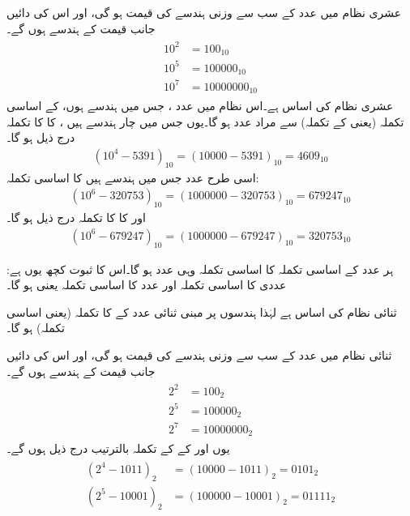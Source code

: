 عشری  نظام میں عدد  کے سب سے وزنی ہندسے کی قیمت  ہو گی، اور اس کی دائیں جانب  قیمت کے  ہندسے ہوں گے۔
\begin{gather}
\begin{aligned}
10^2&=100_{10}\\
10^5&=100000_{10}\\
10^7&=10000000_{10}
\end{aligned}
\end{gather}
عشری  نظام کی اساس  ہے۔اس نظام میں عدد ، جس میں  ہندسے ہوں، کے اساسی تکملہ (یعنی  کے تکملہ) سے مراد عدد  ہو گا۔یوں  جس میں چار ہندسے  ہیں ، کا  کا تکملہ درج ذیل ہو گا۔
\begin{align}
(10^4-5391)_{10}=(10000-5391)_{10}=4609_{10}
\end{align}
اسی طرح عدد  جس میں  ہندسے ہیں کا اساسی تکملہ:
\begin{align}
(10^6-320753)_{10}=(1000000-320753)_{10}=679247_{10}
\end{align} 
اور  کا  کا تکملہ درج ذیل ہو گا۔ 
\begin{align}
(10^6-679247)_{10}=(1000000-679247)_{10}=320753_{10}
\end{align} 

ہر عدد  کے اساسی تکملہ کا اساسی تکملہ وہی عدد  ہو گا۔اس کا ثبوت کچھ یوں ہے: عددی  کا اساسی تکملہ  اور عدد  کا اساسی تکملہ  یعنی  ہو گا۔


ثنائی نظام کی اساس  ہے لہٰذا  ہندسوں پر مبنی ثنائی عدد  کے  کا تکملہ (یعنی اساسی تکملہ)  ہو گا۔

ثنائی نظام میں عدد  کے سب سے وزنی ہندسے کی قیمت  ہو گی، اور اس کی دائیں جانب  قیمت کے  ہندسے ہوں گے۔
\begin{gather}
\begin{aligned}
2^2&=100_2\\
2^5&=100000_2\\
2^7&=10000000_2
\end{aligned}
\end{gather}
یوں  اور  کے  کے تکملہ بالترتیب درج ذیل ہوں گے۔
\begin{gather}
\begin{aligned}\label{مساوات_حساب_تکملہ_اساسی}
(2^4-1011)_2&=(10000-1011)_2=0101_2\\
(2^5-10001)_2&=(100000-10001)_2=01111_2
\end{aligned}
\end{gather} 


